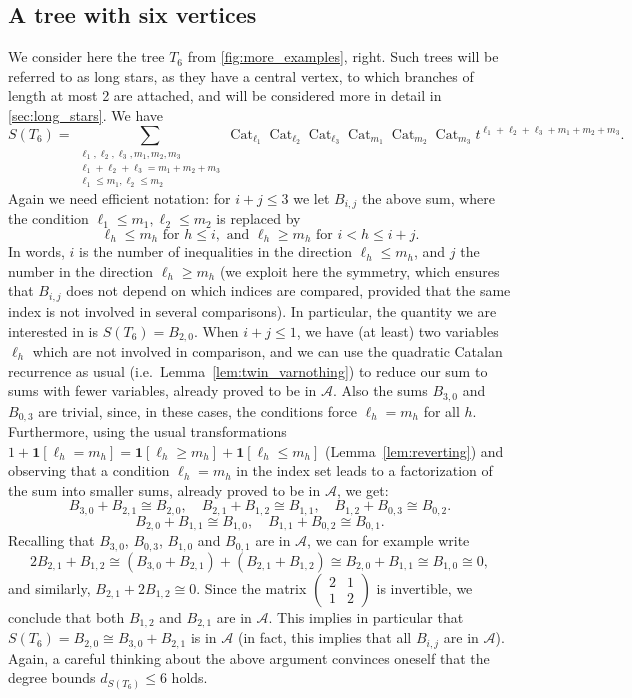 \documentclass[12pt]{amsart}
\theoremstyle{plain}
\theoremstyle{remark}
\def\One{\bm{1}}
\DeclareMathOperator{\Cat}{Cat}
\def\cA{\mathcal{A}}
\begin{document}
\subsection{A tree with six vertices}
\label{ssec:ex_tree_6}
We consider here the tree $T_6$ from \cref{fig:more_examples}, right.
Such trees will be referred to as long stars, as they have a central vertex, to which branches of length at most 2 are attached, and will be considered more in detail in \cref{sec:long_stars}.
We have
\[ S(T_6) =\sum_{\substack{\ell_1, \ell_2, \ell_3, m_1, m_2,m_3 \\ 
\ell_1 + \ell_2+\ell_3= m_1 + m_2 +m_3\\
\ell_1 \le m_1, \ell_2 \le m_2}} 
\Cat_{\ell_1} \Cat_{\ell_2}\Cat_{\ell_3}\Cat_{m_1}\Cat_{m_2}\Cat_{m_3}t^{\ell_1 + \ell_2+\ell_3+m_1 + m_2+m_3} . \]
Again we need efficient notation: for $i+j \le 3$ we let $B_{i,j}$ the above sum, where the condition $\ell_1 \le m_1, \ell_2 \le m_2$
is replaced by
\[ \ell_h \le m_h \text{ for }h \le i, \text{ and } \ell_h \ge m_h \text{ for }i < h \le i+j.\]
In words, $i$ is the number of inequalities in the direction $\ell_h \le m_h$, and 
$j$ the number in the direction $\ell_h \ge m_h$ (we exploit here the symmetry, 
which ensures that $B_{i,j}$ does not depend on which indices are compared,
provided that the same index is not involved in several comparisons).
In particular, the quantity we are interested in is $S(T_6)=B_{2,0}$.
When $i+j \le 1$, we have (at least) two variables $\ell_h$ which are not involved in comparison,
and we can use the quadratic Catalan recurrence as usual (i.e.~Lemma~\ref{lem:twin_varnothing}) to reduce
our sum to sums with fewer variables, already proved to be in $\cA$.
Also the sums $B_{3,0}$ and $B_{0,3}$ are trivial, since, in these cases, the conditions
force $\ell_h=m_h$ for all $h$. Furthermore, using
the usual transformations
 $1+\One[\ell_h=m_h]=\One[\ell_h \ge m_h] + \One[\ell_h \le m_h]$ (Lemma~\ref{lem:reverting})
and observing that a condition $\ell_h=m_h$ in the index set leads to a factorization of the sum
into smaller sums, already proved to be in $\cA$, we get:
\[
  B_{3,0}+B_{2,1} \cong B_{2,0}, \quad B_{2,1} + B_{1,2} \cong B_{1,1}, \quad B_{1,2}+B_{0,3} \cong B_{0,2}.
  \]\[
B_{2,0}+B_{1,1} \cong B_{1,0}, \quad B_{1,1}+B_{0,2} \cong B_{0,1}.
\]
Recalling that $B_{3,0}$, $B_{0,3}$, $B_{1,0}$ and $B_{0,1}$ are in $\cA$, we can for example write
\[2B_{2,1} + B_{1,2} \cong (B_{3,0}+B_{2,1}) + (B_{2,1} + B_{1,2}) \cong B_{2,0}+B_{1,1} \cong B_{1,0} \cong 0,\]
and similarly, $B_{2,1} +2B_{1,2} \cong 0$.
Since the matrix $(\begin{smallmatrix} 2&1 \\ 1&2 \end{smallmatrix})$ is invertible, we conclude that both $B_{1,2}$ and $B_{2,1}$
  are in $\cA$. This implies in particular that $S(T_6) = B_{2,0} \cong B_{3,0}+B_{2,1}$ is in $\cA$ (in fact, this implies
  that all $B_{i,j}$ are in $\cA$).
  Again, a careful thinking about the above argument convinces oneself
  that the degree bounds $d_{S(T_6)} \le 6$ holds.
\end{document}
